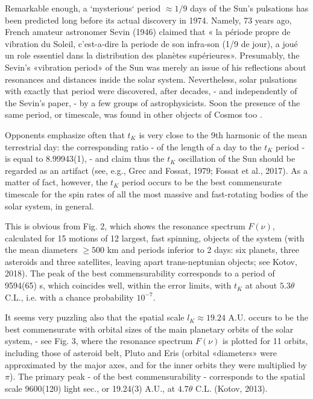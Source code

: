 \documentclass[twoside,draft]{article}
\begin{document}
\begin{sloppypar}
{Remarkable enough, a `mysterious` period $\approx 1/9$ days of the Sun's pulsations has been predicted
long before its actual discovery in 1974. Namely, 73 years ago, French amateur astronomer Sevin
(1946) claimed that « la p\'{e}riode propre de vibration du Soleil, c'est-a-dire la periode de son infra-son (1/9 de jour), a jou\'{e} un role essentiel dans la distribution des plan\`{e}tes sup\'{e}rieures». Presumably,
the Sevin's «vibration period» of the Sun was merely an issue of his reflections about resonances
and distances inside the solar system. Nevertheless, solar pulsations with exactly that period were
discovered, after decades, - and independently of the Sevin's paper, - by a few groups of
astrophysicists. Soon the presence of the same period, or timescale, was found in other objects of
Cosmos too \cite{Kotov1}.

Opponents emphasize often that $t_{K}$ is very close to the 9th harmonic of the mean terrestrial day: the corresponding ratio - of the length of a day to the $t_{K}$ period - is equal to 8.99943(1), - and claim
thus the $t_{K}$ oscillation of the Sun should be regarded as an artifact (see, e.g., Grec and Fossat, 1979;
Fossat et al., 2017). As a matter of fact, however, the $t_{K}$ period occurs to be the best commensurate
timescale for the spin rates of all the most massive and fast-rotating bodies of the solar system, in
general.

This is obvious from Fig. 2, which shows the resonance spectrum $F( \nu )$, calculated for 15
motions of 12 largest, fast spinning, objects of the system (with the mean diameters $\geq 500$ km and
periods inferior to 2 days: six planets, three asteroids and three satellites, leaving apart trans-neptunian
objects; see Kotov, 2018). The peak of the best commensurability corresponds to a period of
9594(65) s, which coincides well, within the error limits, with $t_K$ at about $5.3 \theta$ C.L., i.e. with a
chance probability $10^{-7}$.

It seems very puzzling also that the spatial scale $l_{K} \approx 19.24$ A.U. occurs to be the best
commensurate with orbital sizes of the main planetary orbits of the solar system, - see Fig. 3,
where the resonance spectrum $F( \nu )$ is plotted for 11 orbits, including those of asteroid belt, Pluto
and Eris (orbital «diameters» were approximated by the major axes, and for the inner orbits they
were multiplied by $\pi$). The primary peak - of the best commensurability - corresponds to the
spatial scale 9600(120) light sec., or 19.24(3) A.U., at $4.7 \theta$ C.L. (Kotov, 2013).

}
\end{sloppypar}
\end{document}
